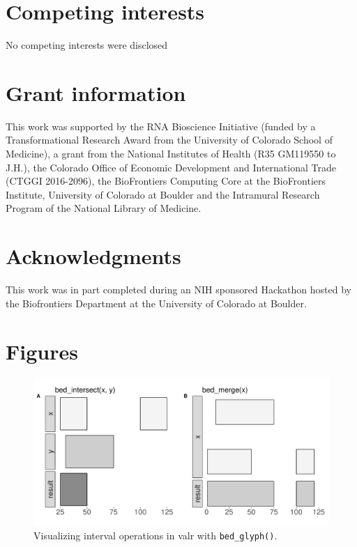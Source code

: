 \documentclass[9pt,a4paper]{extarticle}
\begin{document}
\section*{Competing interests}
No competing interests were disclosed

\section*{Grant information}
This work was supported by the RNA Bioscience Initiative (funded by a Transformational Research Award from the University of Colorado School of Medicine),  a grant from the National Institutes of Health (R35 GM119550 to J.H.), the Colorado Office of Economic Development and International Trade (CTGGI 2016-2096), the BioFrontiers Computing Core at the BioFrontiers Institute, University of Colorado at Boulder and the Intramural Research Program of the National Library of Medicine.

\section*{Acknowledgments}
This work was in part completed during an NIH sponsored Hackathon hosted by the Biofrontiers Department at the University of Colorado at Boulder.

{\small
}

\section*{Figures}


\begin{figure}[!htb]
\centering
\includegraphics[width=1\textwidth]{figure1.pdf}
\caption{\label{fig:Figure 1}Visualizing interval operations in valr with \texttt{bed\_glyph()}.}
\end{figure}
\end{document}
